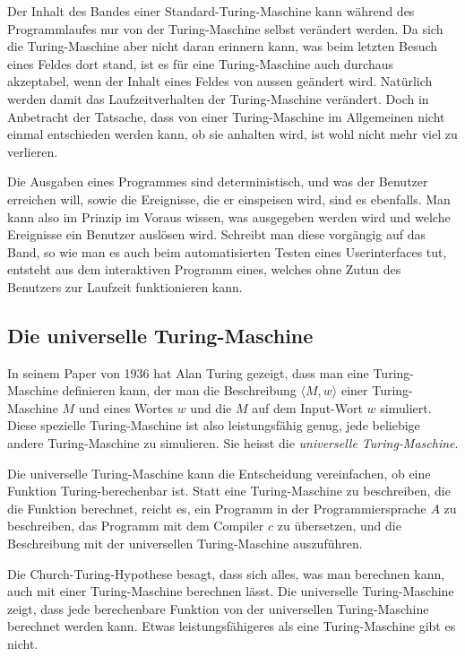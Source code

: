 Der Inhalt des Bandes einer Standard-Turing-Maschine kann während des
Programmlaufes nur von der Turing-Maschine selbst verändert werden.
Da sich die Turing-Maschine aber nicht daran erinnern kann, was beim
letzten Besuch eines Feldes dort stand, ist es für eine Turing-Maschine
auch durchaus akzeptabel, wenn der Inhalt eines Feldes von aussen
geändert wird. Natürlich werden damit das Laufzeitverhalten der
Turing-Maschine verändert. Doch in Anbetracht der
Tatsache, dass von einer Turing-Maschine im Allgemeinen nicht einmal
entschieden werden kann, ob sie anhalten wird, ist wohl nicht mehr
viel zu verlieren.

Die Ausgaben eines Programmes sind deterministisch, und was der Benutzer
erreichen will, sowie die Ereignisse, die er einspeisen wird, sind es ebenfalls.
Man kann also im Prinzip im Voraus wissen, was ausgegeben werden wird
und welche Ereignisse ein Benutzer auslösen wird. Schreibt man diese
vorgängig auf das Band, so wie man es auch beim automatisierten Testen
eines Userinterfaces tut, entsteht aus dem interaktiven Programm eines,
welches ohne Zutun des Benutzers zur Laufzeit funktionieren kann.

\subsection{Die universelle Turing-Maschine}
%
%
In seinem Paper von 1936 hat Alan Turing gezeigt, dass man eine
Turing-Maschine definieren kann,
der man die Beschreibung
$\langle M,w\rangle$
einer Turing-Maschine $M$ und eines Wortes $w$
und die $M$ auf dem Input-Wort $w$ simuliert.
Diese spezielle Turing-Maschine ist also leistungsfähig genug, jede
beliebige andere Turing-Maschine zu simulieren. Sie heisst die {\em universelle
Turing-Maschine}.

Die universelle Turing-Maschine kann die Entscheidung vereinfachen,
ob eine Funktion Turing-berechenbar ist. Statt eine Turing-Maschine
zu beschreiben, die die Funktion berechnet, reicht es, ein Programm
in der Programmiersprache $A$ zu beschreiben, das Programm mit dem
Compiler $c$ zu übersetzen, und die Beschreibung mit der universellen
Turing-Maschine auszuführen.

%
Die Church-Turing-Hypothese besagt, dass sich alles, was man berechnen
kann, auch mit einer Turing-Maschine berechnen lässt. Die universelle
Turing-Maschine zeigt, dass jede berechenbare Funktion von der
universellen Turing-Maschine berechnet werden kann.
Etwas leistungsfähigeres als eine Turing-Maschine gibt es nicht.

